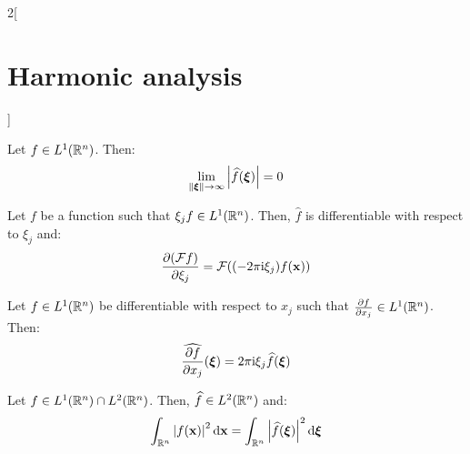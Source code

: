 \documentclass[../../../main_math.tex]{subfiles}
\begin{document}
\begin{multicols}{2}[\section{Harmonic analysis}]
\begin{theorem}
  \end{theorem}
  \begin{theorem}
    Let $f\in L^1(\mathbb{R}^n)$. Then:
    $$\lim_{\left\|\boldsymbol{\mathrm{\xi}}\right\|\to\infty} \abs{\widehat{f}(\boldsymbol{\mathrm{\xi}})}=0$$
  \end{theorem}
  \begin{proposition}
    Let $f$ be a function such that $\xi_j f\in L^1(\mathbb{R}^n)$. Then, $\widehat{f}$ is differentiable with respect to $\xi_j$ and:
    $$\pdv{(\mathcal{F}f)}{\xi_j}(\boldsymbol{\mathrm{\xi}})=\mathcal{F}({(-2\pi\mathrm{i} \xi_j)}f(\boldsymbol{\mathrm{x}}))$$
  \end{proposition}
  \begin{proposition}
    Let $f\in L^1(\mathbb{R}^n)$ be differentiable with respect to $x_j$ such that $\pdv{f}{x_j}\in L^1(\mathbb{R}^n)$. Then: $$\widehat{\pdv{f}{x_j}}(\boldsymbol{\mathrm{\xi}})={2\pi\mathrm{i}\xi_j}\widehat{f}(\boldsymbol{\mathrm{\xi}})$$
  \end{proposition}
  \begin{theorem}
    Let $f\in L^1(\mathbb{R}^n)\cap L^2(\mathbb{R}^n)$. Then, $\widehat{f}\in L^2(\mathbb{R}^n)$ and:
    $$\int_{\mathbb{R}^n}\abs{f(\boldsymbol{\mathrm{x}})}^2\dd{\boldsymbol{\mathrm{x}}}=\int_{\mathbb{R}^n}\abs{\widehat{f}(\boldsymbol{\mathrm{\xi}})}^2\dd{\boldsymbol{\mathrm{\xi}}}$$
  \end{theorem}

\end{multicols}
\end{document}
